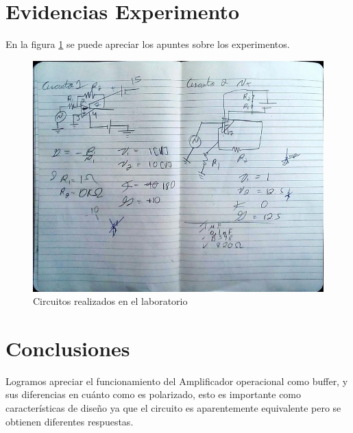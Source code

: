 \documentclass{article}
\begin{document}
\section{Evidencias Experimento}

En la figura \ref{fig:oLens} se puede apreciar los apuntes sobre los experimentos.\\

\begin{figure}[H]
    \centering
    \includegraphics[scale=0.4]{OLensOpAmpBuffer.jpg}
    \caption{Circuitos realizados en el laboratorio}
    \label{fig:oLens}
\end{figure}

\section{Conclusiones}

Logramos apreciar el funcionamiento del Amplificador operacional como buffer, y sus diferencias en cuánto como es polarizado, esto es importante como características de diseño ya que el circuito es aparentemente equivalente pero se obtienen diferentes respuestas.





\end{document}
